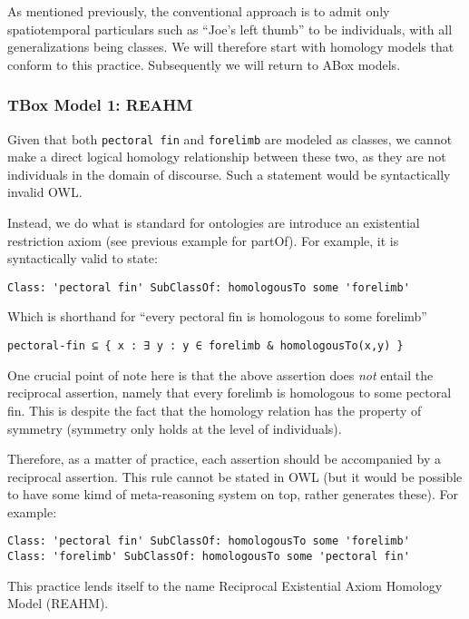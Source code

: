 As mentioned previously, the conventional approach is to admit only
spatiotemporal particulars such as ``Joe's left thumb'' to be
individuals, with all generalizations being classes. We will therefore
start with homology models that conform to this practice. Subsequently
we will return to ABox models.

\subsubsection{TBox Model 1: REAHM}\label{tbox-model-1-reahm}

Given that both \texttt{pectoral fin} and \texttt{forelimb} are modeled
as classes, we cannot make a direct logical homology relationship
between these two, as they are not individuals in the domain of
discourse. Such a statement would be syntactically invalid OWL.

Instead, we do what is standard for ontologies are introduce an
existential restriction axiom (see previous example for partOf). For
example, it is syntactically valid to state:

\begin{verbatim}
Class: 'pectoral fin' SubClassOf: homologousTo some 'forelimb'
\end{verbatim}

Which is shorthand for ``every pectoral fin is homologous to some
forelimb''

\begin{verbatim}
pectoral-fin ⊆ { x : ∃ y : y ∈ forelimb & homologousTo(x,y) }
\end{verbatim}

One crucial point of note here is that the above assertion does
\emph{not} entail the reciprocal assertion, namely that every forelimb
is homologous to some pectoral fin. This is despite the fact that the
homology relation has the property of symmetry (symmetry only holds at
the level of individuals).

Therefore, as a matter of practice, each assertion should be accompanied
by a reciprocal assertion. This rule cannot be stated in OWL (but it
would be possible to have some kimd of meta-reasoning system on top,
rather generates these). For example:

\begin{verbatim}
Class: 'pectoral fin' SubClassOf: homologousTo some 'forelimb'
Class: 'forelimb' SubClassOf: homologousTo some 'pectoral fin'
\end{verbatim}

This practice lends itself to the name Reciprocal Existential Axiom
Homology Model (REAHM).

